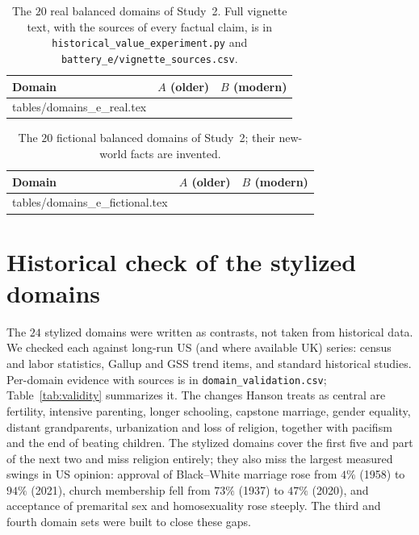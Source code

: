 \documentclass[11pt]{article}
\makeatletter
\newcommand{\tabinput}[1]{\@@input #1 }%
\makeatother
\begin{document}
\begin{table}[!ht]
\centering\scriptsize
\begin{tabularx}{\linewidth}{@{}l>{\raggedright}X>{\raggedright\arraybackslash}X@{}}
\toprule
Domain & $A$ (older) & $B$ (modern) \\
\midrule
\tabinput{tables/domains_e_real.tex}
\bottomrule
\end{tabularx}
\caption{The $20$ real balanced domains of Study~2. Full vignette text, with the sources of every factual claim, is in \texttt{historical\_value\_experiment.py} and \texttt{battery\_e/vignette\_sources.csv}.}
\label{tab:domainsE}
\end{table}

\begin{table}[!ht]
\centering\scriptsize
\begin{tabularx}{\linewidth}{@{}l>{\raggedright}X>{\raggedright\arraybackslash}X@{}}
\toprule
Domain & $A$ (older) & $B$ (modern) \\
\midrule
\tabinput{tables/domains_e_fictional.tex}
\bottomrule
\end{tabularx}
\caption{The $20$ fictional balanced domains of Study~2; their new-world facts are invented.}
\label{tab:domainsEf}
\end{table}

\clearpage
\section{Historical check of the stylized domains}
\label{app:validity}

The $24$ stylized domains were written as contrasts, not taken from historical data.
We checked each against long-run US (and where available UK) series: census and labor statistics, Gallup and GSS trend items, and standard historical studies.
Per-domain evidence with sources is in \texttt{domain\_validation.csv}; Table~\ref{tab:validity} summarizes it.
The changes Hanson treats as central \cite{hanson2024fertility,hanson2026slogans} are fertility, intensive parenting, longer schooling, capstone marriage, gender equality, distant grandparents, urbanization and loss of religion, together with pacifism and the end of beating children.
The stylized domains cover the first five and part of the next two and miss religion entirely; they also miss the largest measured swings in US opinion: approval of Black--White marriage rose from $4\%$ (1958) to $94\%$ (2021), church membership fell from $73\%$ (1937) to $47\%$ (2020), and acceptance of premarital sex and homosexuality rose steeply.
The third and fourth domain sets were built to close these gaps.
\end{document}
